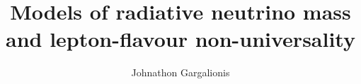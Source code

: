 \title{Models of radiative neutrino mass and lepton-flavour non-universality}

\author{Johnathon Gargalionis}



